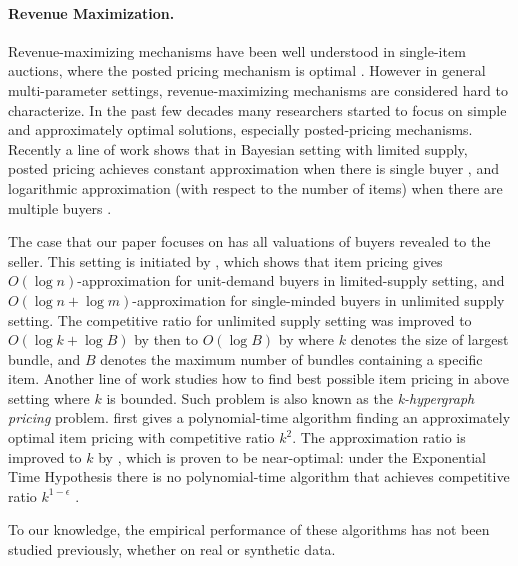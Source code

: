 \paragraph{Revenue Maximization.}
Revenue-maximizing mechanisms have been well understood in single-item auctions, where the posted pricing
mechanism is optimal \cite{myerson1981optimal}. 
However in general multi-parameter settings, revenue-maximizing mechanisms are considered
hard to characterize. In the past few decades many researchers started to 
focus on simple and approximately optimal solutions, especially posted-pricing mechanisms.
Recently a line of work shows that in Bayesian setting with limited supply, posted pricing achieves 
constant approximation when there is single buyer 
\cite{babaioff2014simple, chawla2007algorithmic, 
chawla2010multi, chawla2015power, rubinstein2015simple},
and logarithmic approximation (with respect to the number of items) when there are multiple buyers 
\cite{cai2016duality, chawla2016mechanism, caizhao2017duality}.

The case that our paper focuses on has all valuations of buyers revealed to the seller. This setting
is initiated by \cite{guruswami2005profit}, which shows that item pricing 
gives $O(\log n)$-approximation for unit-demand buyers
in limited-supply setting, and $O(\log n+\log m)$-approximation for single-minded buyers in unlimited supply
setting. The competitive ratio for unlimited supply setting was improved to $O(\log k + \log B)$ 
by \cite{briest2006single} then to $O(\log B)$ by \cite{cheung2008approximation} where 
$k$ denotes the size of largest bundle, and $B$ denotes the maximum number of bundles containing a specific item.
Another line of work studies how to find best possible item pricing in above setting where $k$ is bounded. Such problem 
is also known as the \textit{k-hypergraph pricing} problem.
\cite{briest2006single} first gives a polynomial-time algorithm finding an approximately optimal item pricing
with competitive ratio $k^2$. The approximation ratio is improved to $k$ by \cite{balcan2006approximation},
which is proven to be near-optimal: under the Exponential Time Hypothesis there is no polynomial-time algorithm 
that achieves competitive ratio $k^{1-\epsilon}$ \cite{chalermsook2013independent}.

To our knowledge, the empirical performance of these algorithms has not been studied previously, whether on real or synthetic data.

